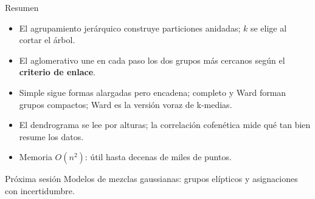 \documentclass[aspectratio=169,11pt]{beamer}
\begin{document}


\begin{frame}{Resumen}
  \begin{itemize}
    \item El agrupamiento jerárquico construye particiones anidadas; $k$ se elige al cortar el árbol.
    \item El aglomerativo une en cada paso los dos grupos más cercanos según el \textbf{criterio de enlace}.
    \item Simple sigue formas alargadas pero encadena; completo y Ward forman grupos compactos;
          Ward es la versión voraz de k-medias.
    \item El dendrograma se lee por alturas; la correlación cofenética mide qué tan bien resume los datos.
    \item Memoria $O(n^2)$: útil hasta decenas de miles de puntos.
  \end{itemize}
  \vspace{6pt}
  \begin{block}{Próxima sesión}
    Modelos de mezclas gaussianas: grupos elípticos y asignaciones con incertidumbre.
  \end{block}
\end{frame}
\end{document}
